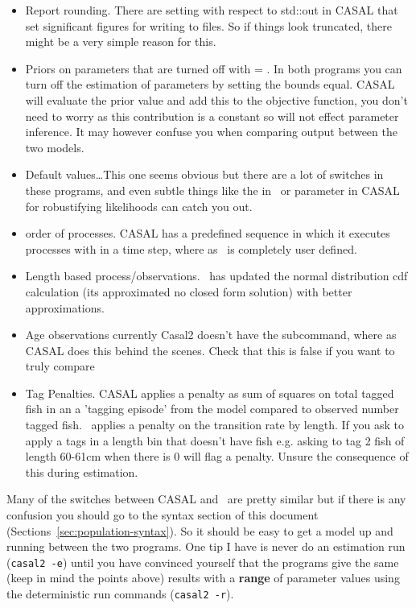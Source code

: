 \begin{itemize}
	\item Report rounding. There are setting with respect to std::out in CASAL that set significant figures for writing to files. So if things look truncated, there might be a very simple reason for this.
	
	\item Priors on parameters that are turned off with  = . In both programs you can turn off the estimation of parameters by setting the bounds equal. CASAL will evaluate the prior value and add this to the objective function, you don't need to worry as this contribution is a constant so will not effect parameter inference. It may however confuse you when comparing output between the two models.
	
	\item Default values\dots This one seems obvious but there are a lot of switches in these programs, and even subtle things like the  in \CNAME\ or  parameter in CASAL for robustifying likelihoods can catch you out.
	
	\item order of processes. CASAL has a predefined sequence in which it executes processes with in a time step, where as \CNAME\ is completely user defined.
		
	\item Length based process/observations. \CNAME\ has updated the normal distribution cdf calculation (its approximated no closed form solution) with better approximations.
	
	\item Age observations currently Casal2 doesn't have the  subcommand, where as CASAL does this behind the scenes. Check that this is false if you want to truly compare
	
	\item Tag Penalties. CASAL applies a penalty as sum of squares on total tagged fish in an a 'tagging episode' from the model compared to observed number tagged fish. \CNAME\ applies a penalty on the transition rate by length. If you ask to apply a tags in a length bin that doesn't have fish e.g. asking to tag 2 fish of length 60-61cm when there is 0 will flag a penalty. Unsure the consequence of this during estimation.
\end{itemize}


Many of the switches between CASAL and \CNAME\ are pretty similar but if there is any confusion you should go to the syntax section of this document (Sections~\ref{sec:population-syntax}). So it should be easy to get a model up and running between the two programs. One tip I have is never do an estimation run (\texttt{casal2 -e}) until you have convinced yourself that the programs give the same (keep in mind the points above) results with a \textbf{range} of parameter values using the deterministic run commands (\texttt{casal2 -r}).


